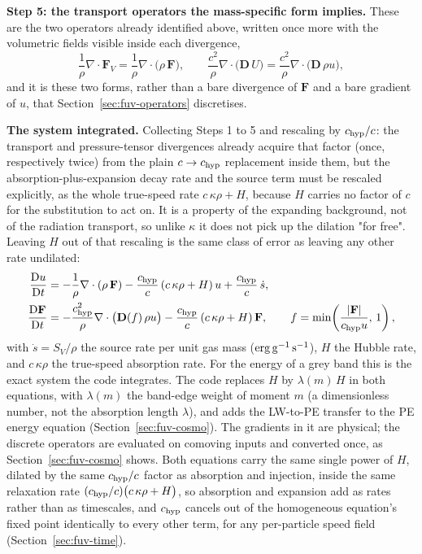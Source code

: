 \textbf{Step 5: the transport operators the mass-specific form implies.}
These are the two operators already identified above, written once more
with the volumetric fields visible inside each divergence,
\begin{equation}
  \frac{1}{\rho}\nabla\cdot\mathbf F_V
    = \frac{1}{\rho}\nabla\cdot\big(\rho\,\mathbf F\big) , \qquad
  \frac{c^2}{\rho}\nabla\cdot\big(\mathbf D\,U\big)
    = \frac{c^2}{\rho}\nabla\cdot\big(\mathbf D\,\rho u\big) ,
  \label{eq:fuv-mass-specific-operators}
\end{equation}
and it is these two forms, rather than a bare divergence of $\mathbf F$ and
a bare gradient of $u$, that Section~\ref{sec:fuv-operators} discretises.

\textbf{The system integrated.} Collecting Steps 1 to 5 and rescaling by
$c_{\rm hyp}/c$: the transport and pressure-tensor divergences already
acquire that factor (once, respectively twice) from the plain
$c\to c_{\rm hyp}$ replacement inside them, but the absorption-plus-expansion
decay rate and the source term must be rescaled explicitly, as the whole
true-speed rate $c\,\kappa\rho + H$, because $H$ carries no
factor of $c$ for the substitution to act on. It is a property of the
expanding background, not of the radiation transport, so unlike
$\kappa$ it does not pick up the dilation "for free". Leaving $H$ out of
that rescaling is the same
class of error as leaving any other rate undilated:
\begin{align}
  \frac{{\rm D}u}{{\rm D}t}
    &= -\frac{1}{\rho}\nabla\cdot(\rho\,\mathbf F)
       - \frac{c_{\rm hyp}}{c}\left(c\,\kappa\rho + H\right) u
       + \frac{c_{\rm hyp}}{c}\,\dot s ,
  \label{eq:fuv-u-eq} \\
  \frac{{\rm D}\mathbf F}{{\rm D}t}
    &= -\frac{c_{\rm hyp}^2}{\rho}\nabla\cdot\big(\mathbf D(f)\,\rho u\big)
       - \frac{c_{\rm hyp}}{c}\left(c\,\kappa\rho + H\right)\mathbf F ,
  \qquad
  f = \min\!\left(\frac{|\mathbf F|}{c_{\rm hyp}u},\,1\right) ,
  \label{eq:fuv-F-eq}
\end{align}
with $\dot s = S_V/\rho$ the source rate per unit gas mass (${\rm
erg\,g^{-1}\,s^{-1}}$), $H$ the Hubble rate, and $c\,\kappa\rho$
the true-speed absorption rate. For the energy of a grey band this is the exact system
the code integrates. The code replaces $H$ by $\lambda(m)\,H$ in both
equations, with $\lambda(m)$ the band-edge weight of moment $m$ (a dimensionless number, not the absorption length $\lambda$), and adds
the LW-to-PE transfer to the PE energy equation
(Section~\ref{sec:fuv-cosmo}). The gradients in it are physical; the discrete operators are
evaluated on comoving inputs and converted once, as
Section~\ref{sec:fuv-cosmo} shows. Both equations carry the same single
power of $H$, dilated by the same $c_{\rm hyp}/c$ factor as absorption
and injection, inside the same relaxation rate
$(c_{\rm hyp}/c)\big(c\,\kappa\rho + H\big)$, so absorption and expansion add
as rates rather than as timescales, and $c_{\rm hyp}$ cancels out of the
homogeneous equation's fixed point identically to every other term, for
any per-particle speed field (Section~\ref{sec:fuv-time}).

